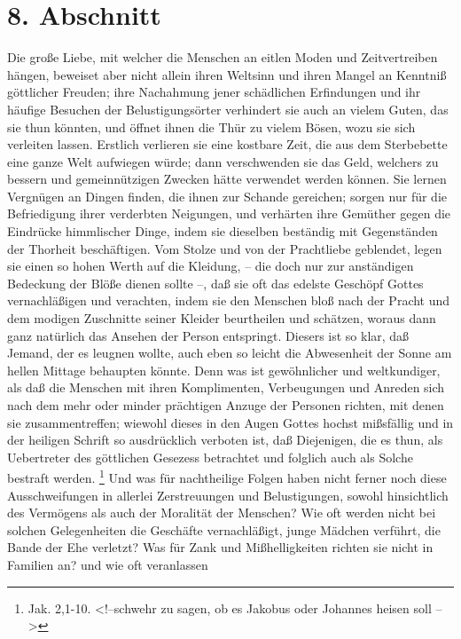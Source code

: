 \section{8. Abschnitt}

Die große Liebe, mit welcher die Menschen an eitlen Moden und Zeitvertreiben
hängen, beweiset aber nicht allein ihren Weltsinn und ihren Mangel an Kenntniß
göttlicher Freuden; ihre Nachahmung jener schädlichen Erfindungen und ihr
häufige Besuchen der Belustigungsörter verhindert sie auch an vielem Guten, das
sie thun könnten, und öffnet ihnen die Thür zu vielem Bösen, wozu sie sich
verleiten lassen. Erstlich verlieren sie eine kostbare Zeit, die aus dem
Sterbebette eine ganze Welt aufwiegen würde; dann verschwenden sie das Geld,
welchers zu bessern und gemeinnützigen Zwecken hätte verwendet werden können.
Sie lernen Vergnügen an Dingen finden, die ihnen zur Schande gereichen; sorgen
nur für die Befriedigung ihrer verderbten Neigungen, und verhärten ihre Gemüther
gegen die Eindrücke himmlischer Dinge, indem sie dieselben beständig mit
Gegenständen der Thorheit beschäftigen. Vom Stolze und von der Prachtliebe
geblendet, legen sie einen so hohen Werth auf die Kleidung, -- die doch nur zur
anständigen Bedeckung der Blöße dienen sollte --, daß sie oft das edelste
Geschöpf Gottes vernachläßigen und verachten, indem sie den Menschen bloß nach
der Pracht und dem modigen Zuschnitte seiner Kleider beurtheilen und schätzen,
woraus dann ganz natürlich das Ansehen der Person entspringt. Diesers ist so
klar, daß Jemand, der es leugnen wollte, auch eben so leicht die Abwesenheit der
Sonne am hellen Mittage behaupten könnte. Denn was ist gewöhnlicher und
weltkundiger, als daß die Menschen mit ihren Komplimenten, Verbeugungen und
Anreden sich nach dem mehr oder minder prächtigen Anzuge der Personen richten,
mit denen sie zusammentreffen; wiewohl dieses in den Augen Gottes hochst
mißsfällig und in der heiligen Schrift so ausdrücklich verboten ist, daß
Diejenigen, die es thun, als Uebertreter des göttlichen Gesezess betrachtet und
folglich auch als Solche bestraft werden. \footnote{Jak. 2,1-10. <!--schwehr zu
sagen, ob es Jakobus oder Johannes heisen soll -->} Und was für nachtheilige
Folgen haben nicht ferner noch diese Ausschweifungen in allerlei Zerstreuungen
und Belustigungen, sowohl hinsichtlich des Vermögens als auch der Moralität der
Menschen? Wie oft werden nicht bei solchen Gelegenheiten die Geschäfte
vernachläßigt, junge Mädchen verführt, die Bande der Ehe verletzt? Was für Zank
und Mißhelligkeiten richten sie nicht in Familien an? und wie oft veranlassen
